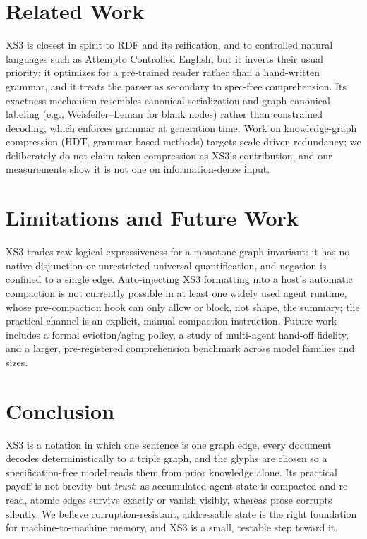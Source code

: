 \documentclass[conference]{IEEEtran}
\begin{document}
\section{Related Work}
XS3 is closest in spirit to RDF and its reification, and to controlled natural
languages such as Attempto Controlled English, but it inverts their usual
priority: it optimizes for a pre-trained reader rather than a hand-written
grammar, and it treats the parser as secondary to spec-free comprehension. Its
exactness mechanism resembles canonical serialization and graph canonical-labeling
(e.g., Weisfeiler--Leman for blank nodes) rather than constrained decoding, which
enforces grammar at generation time. Work on knowledge-graph compression (HDT,
grammar-based methods) targets scale-driven redundancy; we deliberately do not
claim token compression as XS3's contribution, and our measurements show it is
not one on information-dense input.

\section{Limitations and Future Work}
XS3 trades raw logical expressiveness for a monotone-graph invariant: it has no
native disjunction or unrestricted universal quantification, and negation is
confined to a single edge. Auto-injecting XS3 formatting into a host's automatic
compaction is not currently possible in at least one widely used agent runtime,
whose pre-compaction hook can only allow or block, not shape, the summary; the
practical channel is an explicit, manual compaction instruction. Future work
includes a formal eviction/aging policy, a study of multi-agent hand-off fidelity,
and a larger, pre-registered comprehension benchmark across model families and
sizes.

\section{Conclusion}
XS3 is a notation in which one sentence is one graph edge, every document decodes
deterministically to a triple graph, and the glyphs are chosen so a
specification-free model reads them from prior knowledge alone. Its practical
payoff is not brevity but \emph{trust}: as accumulated agent state is compacted
and re-read, atomic edges survive exactly or vanish visibly, whereas prose
corrupts silently. We believe corruption-resistant, addressable state is the
right foundation for machine-to-machine memory, and XS3 is a small, testable step
toward it.
\end{document}
